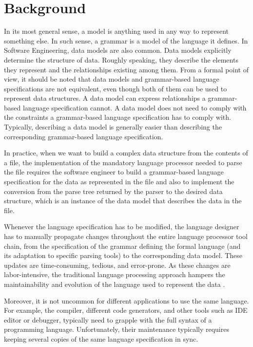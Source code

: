 \documentclass[floatfix,rmp,twocolumn,twoside]{revtex4}
\begin{document}
\section{Background} \label{sec:background}

In its most general sense, a model is anything used in any way to represent something else. In such sense, a grammar is a model of the language it defines.
In Software Engineering, data models are also common. Data models explicitly determine the structure of data. Roughly speaking, they describe the elements they represent and the relationships existing among them.
From a formal point of view, it should be noted that data models and grammar-based language specifications are not equivalent, even though both of them can be used to represent data structures. A data model can express relationships a grammar-based language specification cannot.
A data model does not need to comply with the constraints a grammar-based language specification has to comply with. Typically, describing a data model is generally easier than describing the corresponding grammar-based language specification.

In practice, when we want to build a complex data structure from the contents of a file, the implementation of the mandatory language processor needed to parse the file requires the software engineer to build a grammar-based language specification for the data as represented in the file and also to implement the conversion from the parse tree returned by the parser to the desired data structure, which is an instance of the data model that describes the data in the file.

Whenever the language specification has to be modified, the language designer has to manually propagate changes throughout the entire language processor tool chain, from the specification of the grammar defining the formal language (and its adaptation to specific parsing tools) to the corresponding data model. These updates are time-consuming, tedious, and error-prone. As these changes are labor-intensive, the traditional language processing approach hampers the maintainability and evolution of the language used to represent the data \cite{Kats2010}.

Moreover, it is not uncommon for different applications to use the same language. For example, the compiler, different code generators, and other tools such as IDE editor or debugger, typically need to grapple with the full syntax of a programming language. Unfortunately, their maintenance typically requires keeping several copies of the same language specification in sync.
\end{document}
